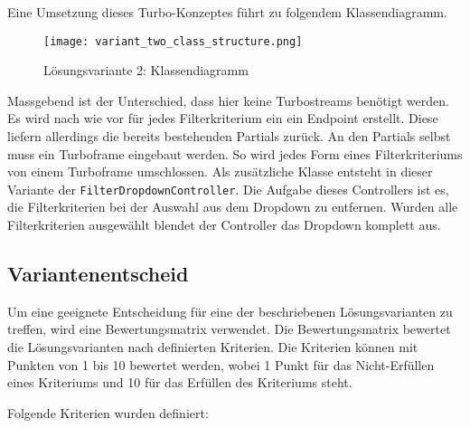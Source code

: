 \newpage

Eine Umsetzung dieses Turbo-Konzeptes führt zu folgendem Klassendiagramm.

\begin{figure}[h]
   \centering
   \texttt{[image: variant\_two\_class\_structure.png]}
   \caption{Lösungsvariante 2: Klassendiagramm}
\end{figure}

Massgebend ist der Unterschied, dass hier keine Turbostreams benötigt werden. Es wird nach wie vor für jedes Filterkriterium ein
ein Endpoint erstellt. Diese liefern allerdings die bereits bestehenden Partials zurück. An den Partials selbst muss ein Turboframe eingebaut werden.
So wird jedes Form eines Filterkriteriums von einem Turboframe umschlossen. Als zusätzliche Klasse entsteht in dieser Variante der \texttt{FilterDropdownController}.
Die Aufgabe dieses Controllers ist es, die Filterkriterien bei der Auswahl aus dem Dropdown zu entfernen. Wurden alle Filterkriterien ausgewählt blendet der Controller das
Dropdown komplett aus. 

\newpage

\subsection{Variantenentscheid}
Um eine geeignete Entscheidung für eine der beschriebenen Lösungsvarianten zu treffen, wird eine Bewertungsmatrix verwendet. Die Bewertungsmatrix
bewertet die Lösungsvarianten nach definierten Kriterien. Die Kriterien können mit Punkten von 1 bis 10 bewertet werden, wobei 1 Punkt für das Nicht-Erfüllen
eines Kriteriums und 10 für das Erfüllen des Kriteriums steht. 

Folgende Kriterien wurden definiert:

